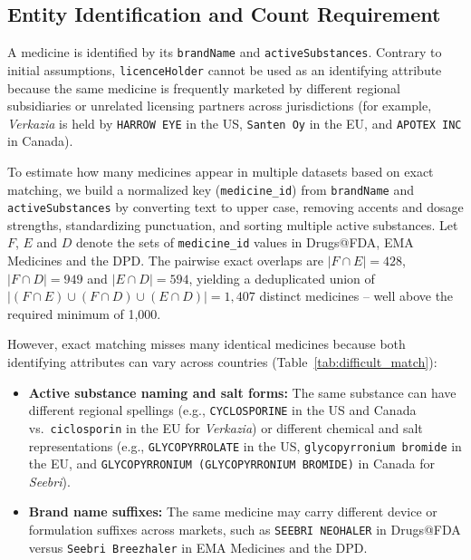 \documentclass[a4paper,oneside]{scrbook}
\begin{document}
\subsection{Entity Identification and Count Requirement}

A medicine is identified by its \texttt{brandName} and \texttt{activeSubstances}. Contrary
to initial assumptions, \texttt{licenceHolder} cannot be used as an identifying attribute
because the same medicine is frequently marketed by different regional subsidiaries or
unrelated licensing partners across jurisdictions (for example, \textit{Verkazia} is held
by \texttt{HARROW EYE} in the US, \texttt{Santen Oy} in the EU, and \texttt{APOTEX INC} in
Canada).

To estimate how many medicines appear in multiple datasets based on exact matching, we build
a normalized key (\texttt{medicine\_id}) from \texttt{brandName} and \texttt{activeSubstances}
by converting text to upper case, removing accents and dosage strengths, standardizing
punctuation, and sorting multiple active substances. Let $F$, $E$ and $D$ denote the sets of
\texttt{medicine\_id} values in Drugs@FDA, EMA Medicines and the DPD. The pairwise exact
overlaps are $|F \cap E| = 428$, $|F \cap D| = 949$ and $|E \cap D| = 594$, yielding a
deduplicated union of $\left|(F \cap E) \cup (F \cap D) \cup (E \cap D)\right| = 1{,}407$
distinct medicines -- well above the required minimum of 1,000.

However, exact matching misses many identical medicines because both identifying attributes
can vary across countries (Table~\ref{tab:difficult_match}):
\begin{itemize}
  \item \textbf{Active substance naming and salt forms:} The same substance can have different
  regional spellings (e.g., \texttt{CYCLOSPORINE} in the US and Canada vs.\
  \texttt{ciclosporin} in the EU for \textit{Verkazia}) or different chemical and salt
  representations (e.g., \texttt{GLYCOPYRROLATE} in the US, \texttt{glycopyrronium bromide}
  in the EU, and \texttt{GLYCOPYRRONIUM (GLYCOPYRRONIUM BROMIDE)} in Canada for
  \textit{Seebri}).
  \item \textbf{Brand name suffixes:} The same medicine may carry different device or
  formulation suffixes across markets, such as \texttt{SEEBRI NEOHALER} in Drugs@FDA versus
  \texttt{Seebri Breezhaler} in EMA Medicines and the DPD.
\end{itemize}
\end{document}
